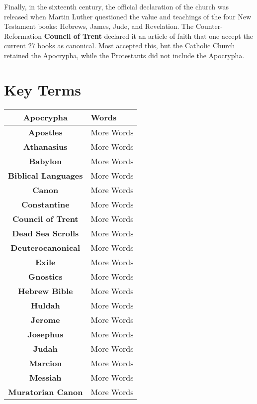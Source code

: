 \documentclass{report}
\begin{document}
        Finally, in the sixteenth century, the official declaration of the church was released when Martin Luther questioned the value and teachings of the four New Testament books: Hebrews, James, Jude, and Revelation. The Counter-Reformation \textbf{Council of Trent} declared it an article of faith that one accept the current 27 books as canonical. Most accepted this, but the Catholic Church retained the Apocrypha, while the Protestants did not include the Apocrypha.

        \section{Key Terms}
        \begin{tabular}{| c | l |}
            \hline
            \textbf{Apocrypha} & Words \\ \hline
            \textbf{Apostles} & More Words \\ \hline
            \textbf{Athanasius} & More Words \\ \hline
            \textbf{Babylon} & More Words \\ \hline
            \textbf{Biblical Languages} & More Words \\ \hline
            \textbf{Canon} & More Words \\ \hline
            \textbf{Constantine} & More Words \\ \hline
            \textbf{Council of Trent} & More Words \\ \hline
            \textbf{Dead Sea Scrolls} & More Words \\ \hline
            \textbf{Deuterocanonical} & More Words \\ \hline
            \textbf{Exile} & More Words \\ \hline
            \textbf{Gnostics} & More Words \\ \hline
            \textbf{Hebrew Bible} & More Words \\ \hline
            \textbf{Huldah} & More Words \\ \hline
            \textbf{Jerome} & More Words \\ \hline
            \textbf{Josephus} & More Words \\ \hline
            \textbf{Judah} & More Words \\ \hline
            \textbf{Marcion} & More Words \\ \hline
            \textbf{Messiah} & More Words \\ \hline
            \textbf{Muratorian Canon} & More Words \\ \hline

\end{tabular}
\end{document}
